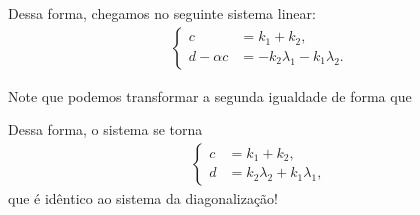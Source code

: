 Dessa forma, chegamos no seguinte sistema linear:
\begin{gather*}
  \begin{cases}
    c &= k_1 + k_2, \\
    d - \alpha c &= -k_2\lambda_1 -k_1\lambda_2.
  \end{cases}
\end{gather*}

Note que podemos transformar a segunda igualdade de forma que
\begin{calcproof}
\end{calcproof}

Dessa forma, o sistema se torna
\begin{gather*}
  \begin{cases}
    c &= k_1 + k_2, \\
    d &= k_2\lambda_2 + k_1\lambda_1,
  \end{cases}
\end{gather*}
que é idêntico ao sistema da diagonalização!
